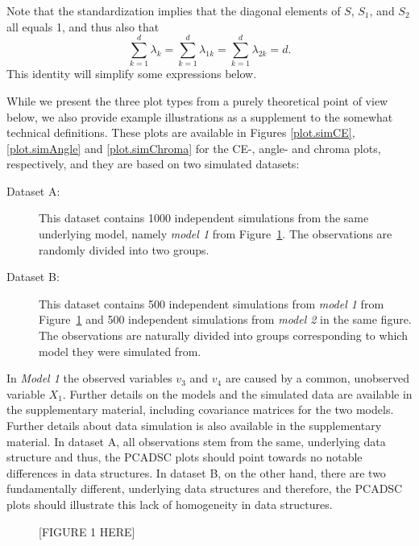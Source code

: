 \documentclass[a4paper,14pt]{article}
\begin{document}
Note that the standardization implies that the diagonal elements of $S$, $S_1$, and $S_2$ all equals 1, and thus also that
\begin{equation*}
\sum_{k=1}^d \lambda_k = \sum_{k=1}^d \lambda_{1k} = \sum_{k=1}^d \lambda_{2k} =  d.
\end{equation*}
This identity will simplify some expressions below.

While we present the three plot types from a purely theoretical point of view below, we also provide example illustrations as a supplement to the somewhat technical definitions. These plots are available in Figures \ref{plot.simCE}, \ref{plot.simAngle} and \ref{plot.simChroma} for the CE-, angle- and chroma plots, respectively, and they are based on two simulated datasets:
\begin{description}
\item[Dataset A:] This dataset contains 1000 independent simulations from the same underlying model, namely \textit{model 1} from Figure~\ref{fig:simGraphs}. The observations are randomly divided into two groups.
\item[Dataset B:] This dataset contains 500 independent simulations from \textit{model 1} from Figure~\ref{fig:simGraphs} and 500 independent simulations from \textit{model 2} in the same figure. The observations are naturally divided into groups corresponding to which model they were simulated from.
\end{description}

In \textit{Model 1} the observed variables $v_3$ and $v_4$ are caused by a common, unobserved variable $X_1$. Further details on the models and the simulated data are available in the supplementary material, including covariance matrices for the two models. Further details about data simulation is also available in the supplementary material. In dataset A, all observations stem from the same, underlying data structure and thus, the PCADSC plots should point towards no notable differences in data structures. In dataset B, on the other hand, there are two fundamentally different, underlying data structures and therefore, the PCADSC plots should illustrate this lack of homogeneity in data structures.


\begin{figure}[!h]
\caption{[FIGURE 1 HERE]}
\label{fig:simGraphs}
\end{figure}
\end{document}
